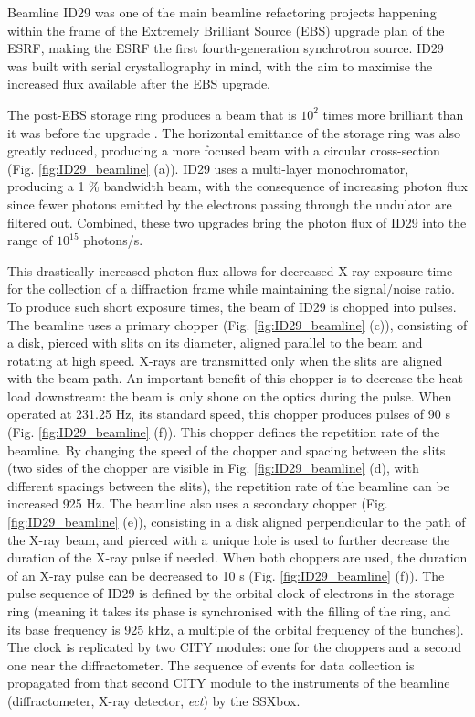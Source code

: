 Beamline ID29 was one of the main beamline refactoring projects happening within the frame of the Extremely Brilliant Source (EBS) upgrade plan of the ESRF, making the ESRF the first fourth-generation synchrotron source. ID29 was built with serial crystallography in mind, with the aim to maximise the increased flux available after the EBS upgrade.

The post-EBS storage ring produces a beam that is \(10^2\) times more brilliant than it was before the upgrade \parencite{griecoStructuralDynamicsFunctional2024}. The horizontal emittance of the storage ring was also greatly reduced, producing a more focused beam with a circular cross-section (Fig. \ref{fig:ID29_beamline} (a)). ID29 uses a multi-layer monochromator, producing a 1 \% bandwidth beam, with the consequence of increasing photon flux since fewer photons emitted by the electrons passing through the undulator are filtered out. Combined, these two upgrades bring the photon flux of ID29 into the range of \( 10^{15}\) photons/s. 

This drastically increased photon flux allows for decreased X-ray exposure time for the collection of a diffraction frame while maintaining the signal/noise ratio. To produce such short exposure times, the beam of ID29 is chopped into pulses. The beamline uses a primary chopper (Fig. \ref{fig:ID29_beamline} (c)), consisting of a disk, pierced with slits on its diameter, aligned parallel to the beam and rotating at high speed. X-rays are transmitted only when the slits are aligned with the beam path. An important benefit of this chopper is to decrease the heat load downstream: the beam is only shone on the optics during the pulse. When operated at 231.25 Hz, its standard speed, this chopper produces pulses of 90 \textmu s (Fig. \ref{fig:ID29_beamline} (f)). This chopper defines the repetition rate of the beamline. By changing the speed of the chopper and spacing between the slits (two sides of the chopper are visible in Fig. \ref{fig:ID29_beamline} (d), with different spacings between the slits), the repetition rate of the beamline can be increased 925 Hz. 
\noindent The beamline also uses a secondary chopper (Fig. \ref{fig:ID29_beamline} (e)), consisting in a disk aligned perpendicular to the path of the X-ray beam, and pierced with a unique hole is used to further decrease the duration of the X-ray pulse if needed. When both choppers are used, the duration of an X-ray pulse can be decreased to 10 \textmu s (Fig. \ref{fig:ID29_beamline} (f)). The pulse sequence of ID29 is defined by the orbital clock of electrons in the storage ring (meaning it takes its phase is synchronised with the filling of the ring, and its base frequency is 925 kHz, a multiple of the orbital frequency of the bunches). The clock is replicated by two CITY modules: one for the choppers and a second one near the diffractometer. The sequence of events for data collection is propagated from that second CITY module to the instruments of the beamline (diffractometer, X-ray detector, \textit{ect}) by the SSXbox.

